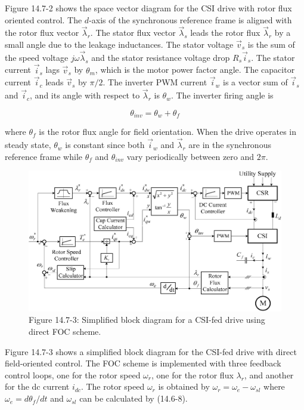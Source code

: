 \documentclass[letterpaper,12pt]{article}
\begin{document}
Figure 14.7-2 shows the space vector diagram for the CSI drive with rotor flux oriented control. The $d$-axis of the synchronous reference frame is aligned with the rotor flux vector $\vec{\lambda}_r$. The stator flux vector $\vec{\lambda}_s$ leads the rotor flux $\vec{\lambda}_r$ by a small angle due to the leakage inductances. The stator voltage $\vec{v}_s$ is the sum of the speed voltage $j\omega \vec{\lambda}_s$ and the stator resistance voltage drop $R_s \vec{i}_s$. The stator current $\vec{i}_s$ lags $\vec{v}_s$ by $\theta_{m}$, which is the motor power factor angle. The capacitor current $\vec{i}_c$ leads $\vec{v}_s$ by $\pi/2$. The inverter PWM current $\vec{i}_w$ is a vector sum of $\vec{i}_s$ and $\vec{i}_c$, and its angle with respect to $\vec{\lambda}_r$ is $\theta_{w}$. The inverter firing angle is

\begin{equation}
\theta_{inv} = \theta_{w} + \theta_{f} \tag{14.7-1}
\end{equation}

where $\theta_{f}$ is the rotor flux angle for field orientation. When the drive operates in steady state, $\theta_{w}$ is constant since both $\vec{i}_w$ and $\vec{\lambda}_r$ are in the synchronous reference frame while $\theta_{f}$ and $\theta_{inv}$ vary periodically between zero and $2\pi$.

\begin{figure}[h]
\centering
\includegraphics{graficos/img22.jpg}
\caption{Figure 14.7-3: Simplified block diagram for a CSI-fed drive using direct FOC scheme.}
\end{figure}
\FloatBarrier

Figure 14.7-3 shows a simplified block diagram for the CSI-fed drive with direct field-oriented control. The FOC scheme is implemented with three feedback control loops, one for the rotor speed $\omega_r$, one for the rotor flux $\lambda_r$, and another for the dc current $i_{dc}$. The rotor speed $\omega_r$ is obtained by $\omega_r = \omega_e - \omega_{sl}$ where $\omega_e = d\theta_f / dt$ and $\omega_{sl}$ can be calculated by (14.6-8).
\end{document}
